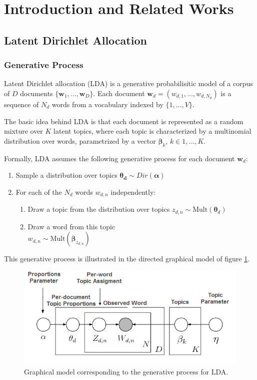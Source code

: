 \documentclass{article}
\begin{document}
\section{Introduction and Related Works}

\subsection{Latent Dirichlet Allocation}

\subsubsection{Generative Process}
Latent Dirichlet allocation (LDA) is a generative probabilisitic model of a corpus of $D$ documents $\{\mathbf{w}_1,..., \mathbf{w}_D\}$. Each document $\mathbf{w}_d = (w_{d,1},...,w_{d,N_d})$ is a sequence of $N_d$ words from a vocabulary indexed by $\{1,...,V\}$. 

The basic idea behind LDA is that each document is represented as a random mixture over $K$ latent topics, where each topic is characterized by a multinomial distribution over words, parametrized by a vector $\bm{\beta}_{k}$, $k \in {1,...,K}$. 

Formally, LDA assumes the following generative process for each document $\mathbf{w}_d$:
\begin{enumerate}
\item Sample a distribution over topics $\bm{\theta_d} \sim Dir(\bm{\alpha})$
\item For each of the $N_d$ words $w_{d,n}$ independently:
\begin{enumerate}
\item Draw a topic from the distribution over topics $z_{d,n} \sim \mathrm{Mult}(\bm{\theta}_d)$
\item Draw a word from this topic \\ 
$w_{d,n} \sim \mathrm{Mult}(\bm{\beta}_{z_{d,n}})$
\end{enumerate}
\end{enumerate}
This generative process is illustrated in the directed graphical model of figure \ref{graph_model}.



\begin{figure}[ht]
\begin{center}
\centerline{\includegraphics[width=\columnwidth]{LDA_graph_model}}
\caption{Graphical model corresponding to the generative process for LDA.}
\label{graph_model}
\end{center}
\vskip -0.2in
\end{figure} 
\end{document}
